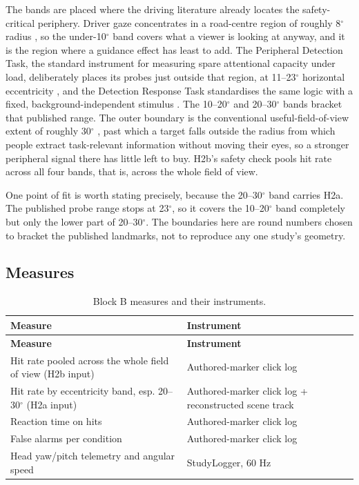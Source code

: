 The bands are placed where the driving literature already locates the safety-critical periphery.
Driver gaze concentrates in a road-centre region of roughly 8$^{\circ}$ radius \citep{victor2005}, so
the under-10$^{\circ}$ band covers what a viewer is looking at anyway, and it is the region where a
guidance effect has least to add. The Peripheral Detection Task, the standard instrument for
measuring spare attentional capacity under load, deliberately places its probes just outside that
region, at 11–23$^{\circ}$ horizontal eccentricity \citep{jahn2005}, and the Detection Response Task
standardises the same logic with a fixed, background-independent stimulus \citep{iso2016}. The
10–20$^{\circ}$ and 20–30$^{\circ}$ bands bracket that published range. The outer boundary is the
conventional useful-field-of-view extent of roughly 30$^{\circ}$ \citep{ball1993}, past which a target
falls outside the radius from which people extract task-relevant information without moving their
eyes, so a stronger peripheral signal there has little left to buy. H2b's safety check pools hit rate
across all four bands, that is, across the whole field of view.

One point of fit is worth stating precisely, because the 20--30$^{\circ}$ band carries H2a. The
published probe range stops at 23$^{\circ}$, so it covers the 10–20$^{\circ}$ band completely but only
the lower part of 20–30$^{\circ}$. The boundaries here are round numbers chosen to bracket the
published landmarks, not to reproduce any one study's geometry.

\subsection{Measures}

\begin{longtable}{p{}|p{}}
\caption{Block B measures and their instruments.}\\
\hline
\textbf{Measure} & \textbf{Instrument} \\
\hline
\endfirsthead
\hline
\textbf{Measure} & \textbf{Instrument} \\
\hline
\endhead
\hline
Hit rate pooled across the whole field of view (H2b input) & Authored-marker click log \\
Hit rate by eccentricity band, esp. 20–30$^{\circ}$ (H2a input) & Authored-marker click log + reconstructed scene track \\
Reaction time on hits & Authored-marker click log \\
False alarms per condition & Authored-marker click log \\
Head yaw/pitch telemetry and angular speed & StudyLogger, 60 Hz \\
\hline
\end{longtable}

